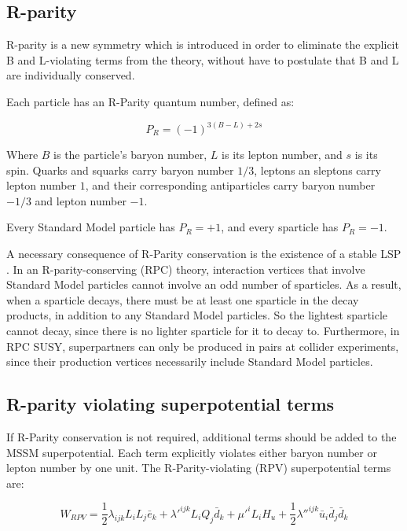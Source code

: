\subsection{R-parity}\label{subsec:r_parity}

R-parity is a new symmetry which is introduced in order to eliminate the explicit B and L-violating terms from the
theory, without have to postulate that B and L are individually conserved.

Each particle has an R-Parity quantum number, defined as:

\begin{equation}\label{eq:r_parity_def}
    P_R = \left(-1\right)^{3\left(B-L\right)+2s}
\end{equation}

Where $B$ is the particle's baryon number, $L$ is its lepton number, and $s$ is its spin.
Quarks and squarks carry baryon number $1/3$, leptons an sleptons carry lepton number $1$,
and their corresponding antiparticles carry baryon number $-1/3$ and lepton number $-1$.

Every Standard Model particle has $P_R = +1$, and every sparticle has $P_R = -1$.

A necessary consequence of R-Parity conservation is the existence of a stable LSP .
In an R-parity-conserving (RPC) theory, interaction vertices that involve Standard Model particles cannot involve an odd number of sparticles.
As a result, when a sparticle decays, there must be at least one sparticle in the decay products,
in addition to any Standard Model particles.
So the lightest sparticle cannot decay, since there is no lighter sparticle for it to decay to.
Furthermore, in RPC SUSY, superpartners can only be produced in pairs at collider experiments,
since their production vertices necessarily include Standard Model particles.

\subsection{R-parity violating superpotential terms}\label{subsec:rpv}

If R-Parity conservation is not required, additional terms should be added to the MSSM superpotential.
Each term explicitly violates either baryon number or lepton number by one unit.
The R-Parity-violating (RPV) superpotential terms are:

\begin{equation}\label{eq:rpv_superpotential}
    W_{RPV} = \frac{1}{2} \lambda_{ijk} L_i L_j \bar{e}_k
    + \lambda'^{ijk} L_i Q_j \bar{d}_k + \mu'^i L_i H_u
    + \frac{1}{2} \lambda''^{ijk} \bar{u}_i \bar{d}_j \bar{d}_k
\end{equation}

